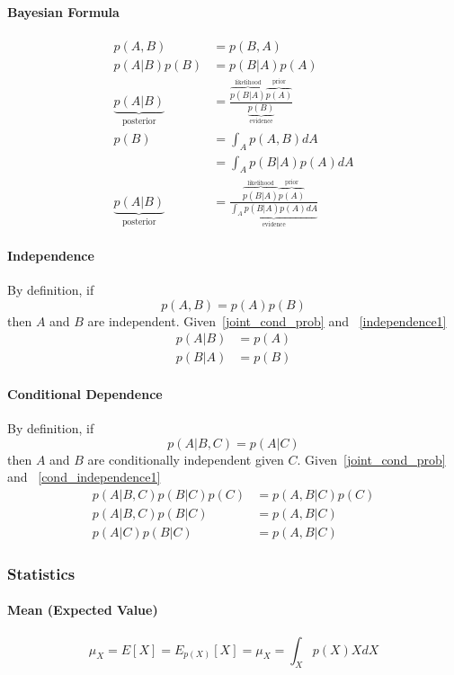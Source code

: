 \documentclass{article}
\numberwithin{equation}{subsection}
\begin{document}
\paragraph{Bayesian Formula} 
\begin{align}
    p(A,B) &= p(B,A)\\
    p(A|B)p(B) &= p(B|A)p(A)\\
    \underbrace{p(A|B)}_{\text{posterior}} &= \frac{\overbrace{p(B|A)}^\text{likelihood}\overbrace{p(A)}^\text{prior}}{\underbrace{p(B)}_\text{evidence}}\\
    p(B) &= \int_A p(A,B)dA\\
    &= \int_A p(B|A)p(A)dA\\
    \underbrace{p(A|B)}_{\text{posterior}} &= \frac{\overbrace{p(B|A)}^\text{likelihood}\overbrace{p(A)}^\text{prior}}{\underbrace{\int_A p(B|A)p(A)dA}_\text{evidence}}\label{bayesian}
\end{align}
\paragraph{Independence}
By definition, if
\begin{equation}
    p(A,B) = p(A)p(B) \label{independence1}
\end{equation}
then $A$ and $B$ are independent. Given~\ref{joint_cond_prob} and ~\ref{independence1}
\begin{align}
    p(A|B) &= p(A)\\
    p(B|A) &= p(B)
\end{align}
\paragraph{Conditional Dependence}
By definition, if
\begin{equation}
    p(A|B,C) = p(A|C) \label{cond_independence1}
\end{equation}
then $A$ and $B$ are conditionally independent given $C$.
Given~\ref{joint_cond_prob} and ~\ref{cond_independence1}
\begin{align}
    p(A|B,C)p(B|C)p(C) &= p(A,B|C)p(C)\\
    p(A|B,C)p(B|C) &= p(A,B|C)\\
    p(A|C)p(B|C) &= p(A,B|C) \label{cond_independence2}
\end{align}
\subsubsection{Statistics}
\paragraph{Mean (Expected Value)}
\begin{equation}
    \mu_X = E[X] = E_{p(X)}[X] = \mu_X = \int_X p(X)X dX
\end{equation}
\end{document}
